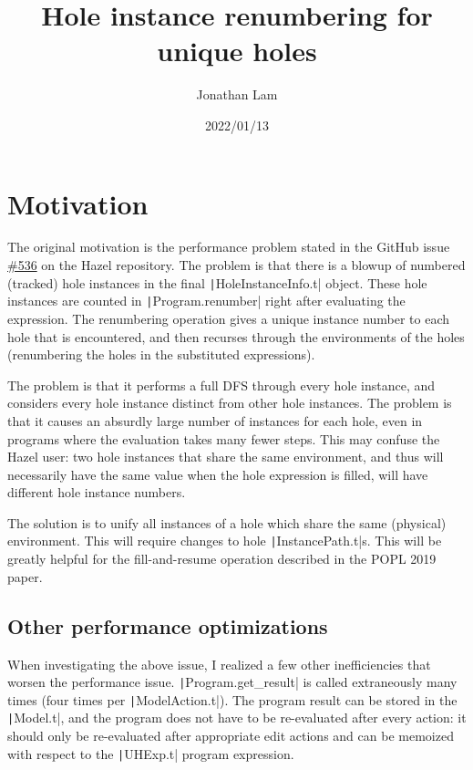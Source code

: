 \documentclass{article}
\title{Hole instance renumbering for unique holes}
\author{Jonathan Lam}
\date{2022/01/13}
\begin{document}
\maketitle{}

\section{Motivation}
The original motivation is the performance problem stated in the GitHub issue \href{https://github.com/hazelgrove/hazel/issues/536}{\#536} on the Hazel repository. The problem is that there is a blowup of numbered (tracked) hole instances in the final \texttt|HoleInstanceInfo.t| object. These hole instances are counted in \texttt|Program.renumber| right after evaluating the expression. The renumbering operation gives a unique instance number to each hole that is encountered, and then recurses through the environments of the holes (renumbering the holes in the substituted expressions).

The problem is that it performs a full DFS through every hole instance, and considers every hole instance distinct from other hole instances. The problem is that it causes an absurdly large number of instances for each hole, even in programs where the evaluation takes many fewer steps. This may confuse the Hazel user: two hole instances that share the same environment, and thus will necessarily have the same value when the hole expression is filled, will have different hole instance numbers.

The solution is to unify all instances of a hole which share the same (physical) environment. This will require changes to hole \texttt|InstancePath.t|s. This will be greatly helpful for the fill-and-resume operation described in the POPL 2019 paper.

\subsection{Other performance optimizations}
When investigating the above issue, I realized a few other inefficiencies that worsen the performance issue. \texttt|Program.get_result| is called extraneously many times (four times per \texttt|ModelAction.t|). The program result can be stored in the \texttt|Model.t|, and the program does not have to be re-evaluated after every action: it should only be re-evaluated after appropriate edit actions and can be memoized with respect to the \texttt|UHExp.t| program expression.
\end{document}
